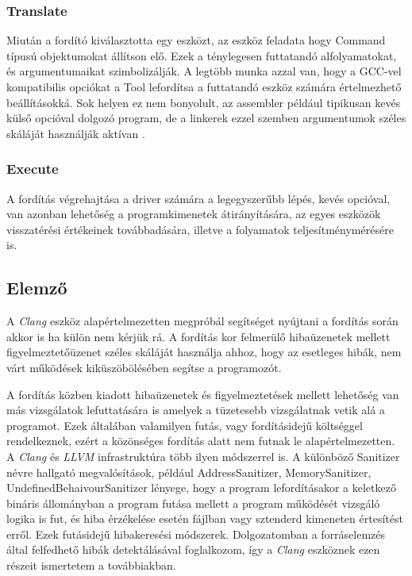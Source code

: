 \documentclass[a4paper,12pt]{report}
\begin{document}
\subsubsection{Translate}
Miután a fordító kiválasztotta egy eszközt, az eszköz feladata hogy Command típusú objektumokat állítson elő. Ezek a ténylegesen futtatandó alfolyamatokat, és argumentumaikat szimbolizálják. A legtöbb munka azzal van, hogy a GCC-vel kompatibilis opciókat a Tool lefordítsa a futtatandó eszköz számára értelmezhető beállításokká. Sok helyen ez nem bonyolult, az assembler például tipikusan kevés külső opcióval dolgozó program, de a linkerek ezzel szemben argumentumok széles skáláját használják aktívan \cite{clangdriverinternals}.

\subsubsection{Execute}
A fordítás végrehajtása a driver számára a legegyszerűbb lépés, kevés opcióval, van azonban lehetőség a programkimenetek átirányítására, az egyes eszközök visszatérési értékeinek továbbadására, illetve a folyamatok teljesítménymérésére is.

\subsection{Elemző}
A \emph{Clang} eszköz alapértelmezetten megpróbál segítséget nyújtani a fordítás során akkor is ha külön nem kérjük rá. A fordítás kor felmerülő hibaüzenetek mellett figyelmeztetőüzenet széles skáláját használja ahhoz, hogy az esetleges hibák, nem várt működések kiküszöbölésében segítse a programozót.

A fordítás közben kiadott hibaüzenetek és figyelmeztetések mellett lehetőség van más vizsgálatok lefuttatására is amelyek a tüzetesebb vizsgálatnak vetik alá a programot. Ezek általában valamilyen futás, vagy fordításidejű költséggel rendelkeznek, ezért a közönséges fordítás alatt nem futnak le alapértelmezetten.
A \emph{Clang} és \emph{LLVM} infrastruktúra több ilyen módszerrel is. A különböző Sanitizer névre hallgató megvalósítások, például AddressSanitizer, MemorySanitizer, UndefinedBehaivourSanitizer lényege, hogy a program lefordításakor a keletkező bináris állományban a program futása mellett a program működését vizsgáló logika is fut, és hiba érzékelése esetén fájlban vagy sztenderd kimeneten értesítést erről. Ezek futásidejű hibakeresési módszerek. Dolgozatomban a forráselemzés által felfedhető hibák detektálásával foglalkozom, így a \emph{Clang} eszköznek ezen részeit ismertetem a továbbiakban.
\end{document}
